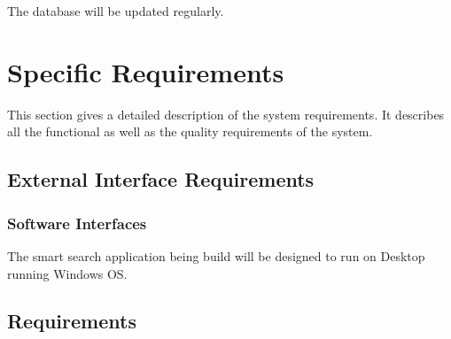 \documentclass[a4paper,10pt]{article}
\begin{document}
	The database will be updated regularly.

	\newpage
	
	\section{Specific Requirements}
This section gives a detailed description of the system requirements. It describes all the functional as well as the quality requirements of the system.

	\subsection{External Interface Requirements}

            \subsubsection{Software Interfaces}
The smart search application being build will be designed to run on Desktop running Windows OS.

	\subsection{Requirements}
\end{document}
